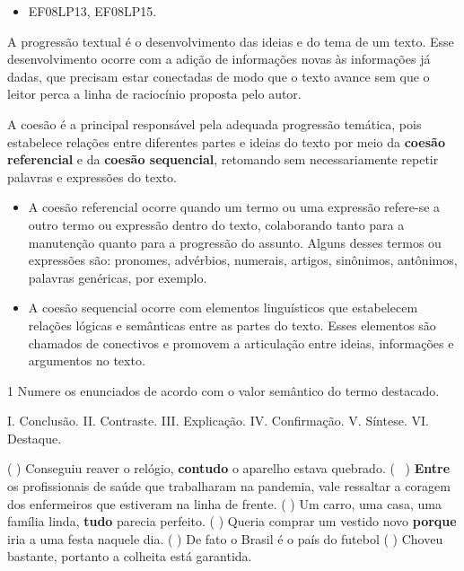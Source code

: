 \begin{itemize}
\tightlist
\item
  EF08LP13, EF08LP15.
\end{itemize}

A progressão textual é o desenvolvimento das ideias e do tema de um
texto. Esse desenvolvimento ocorre com a adição de informações novas às
informações já dadas, que precisam estar conectadas de modo que o texto
avance sem que o leitor perca a linha de raciocínio proposta pelo autor.

A coesão é a principal responsável pela adequada progressão temática,
pois estabelece relações entre diferentes partes e ideias do texto por
meio da \textbf{coesão referencial} e da \textbf{coesão sequencial},
retomando sem necessariamente repetir palavras e expressões do texto.

\begin{itemize}
\item
  A coesão referencial ocorre quando um termo ou uma expressão refere-se
  a outro termo ou expressão dentro do texto, colaborando tanto para a
  manutenção quanto para a progressão do assunto. Alguns desses termos
  ou expressões são: pronomes, advérbios, numerais, artigos, sinônimos,
  antônimos, palavras genéricas, por exemplo.
\item
  A coesão sequencial ocorre com elementos linguísticos que estabelecem
  relações lógicas e semânticas entre as partes do texto. Esses
  elementos são chamados de conectivos e promovem a articulação entre
  ideias, informações e argumentos no texto.
\end{itemize}


\num{1} Numere os enunciados de acordo com o valor semântico do termo
destacado.

I. Conclusão. II. Contraste. III. Explicação. IV. Confirmação. V.
Síntese. VI. Destaque.

(  ) Conseguiu reaver o relógio, \textbf{contudo} o aparelho
estava quebrado. (~ ) \textbf{Entre} os profissionais de
saúde que trabalharam na pandemia, vale ressaltar a coragem dos
enfermeiros que estiveram na linha de frente. (  ) Um carro,
uma casa, uma família linda, \textbf{tudo} parecia perfeito. (
 ) Queria comprar um vestido novo \textbf{porque} iria a uma
festa naquele dia. (  ) De fato o Brasil é o país do futebol
(  ) Choveu bastante, portanto a colheita está garantida.

